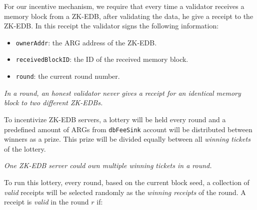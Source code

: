 \documentclass[11pt, A4]{report}
\begin{document}
    For our incentive mechanism, we require that every time a validator receives a memory block from a ZK-EDB, after
    validating the data, he give a receipt to the ZK-EDB. In this receipt the validator signs the following information:

    \begin{itemize}
        \item \texttt{ownerAddr}: the ARG address of the ZK-EDB\@.
        \item \texttt{receivedBlockID}: the ID of the received memory block.
        \item \texttt{round}: the current round number.
    \end{itemize}

    \emph{In a round, an honest validator never gives a receipt for an identical memory block to two different ZK-EDBs.}

    To incentivize ZK-EDB servers, a lottery will be held every round and a predefined amount of ARGs from
    \texttt{dbFeeSink} account will be distributed between winners as a prize. This prize will be divided equally
    between all \emph{winning tickets} of the lottery.

    \emph{One ZK-EDB server could own multiple winning tickets in a round.}

    To run this lottery, every round, based on the current block seed, a collection of \emph{valid} receipts will be
    selected randomly as the \emph{winning receipts} of the round. A receipt is \emph{valid} in the round \(r\) if:
\end{document}
